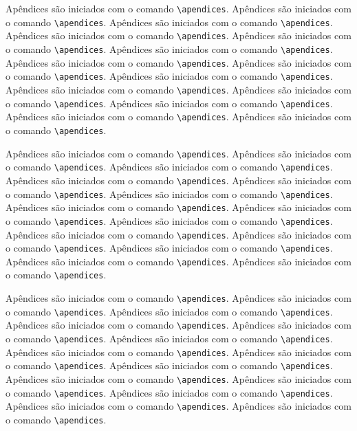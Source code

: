 Apêndices são iniciados com o comando \verb|\apendices|.
Apêndices são iniciados com o comando \verb|\apendices|.
Apêndices são iniciados com o comando \verb|\apendices|.
Apêndices são iniciados com o comando \verb|\apendices|.
Apêndices são iniciados com o comando \verb|\apendices|.
Apêndices são iniciados com o comando \verb|\apendices|.
Apêndices são iniciados com o comando \verb|\apendices|.
Apêndices são iniciados com o comando \verb|\apendices|.
Apêndices são iniciados com o comando \verb|\apendices|.
Apêndices são iniciados com o comando \verb|\apendices|.
Apêndices são iniciados com o comando \verb|\apendices|.
Apêndices são iniciados com o comando \verb|\apendices|.
Apêndices são iniciados com o comando \verb|\apendices|.
Apêndices são iniciados com o comando \verb|\apendices|.

Apêndices são iniciados com o comando \verb|\apendices|.
Apêndices são iniciados com o comando \verb|\apendices|.
Apêndices são iniciados com o comando \verb|\apendices|.
Apêndices são iniciados com o comando \verb|\apendices|.
Apêndices são iniciados com o comando \verb|\apendices|.
Apêndices são iniciados com o comando \verb|\apendices|.
Apêndices são iniciados com o comando \verb|\apendices|.
Apêndices são iniciados com o comando \verb|\apendices|.
Apêndices são iniciados com o comando \verb|\apendices|.
Apêndices são iniciados com o comando \verb|\apendices|.
Apêndices são iniciados com o comando \verb|\apendices|.
Apêndices são iniciados com o comando \verb|\apendices|.
Apêndices são iniciados com o comando \verb|\apendices|.
Apêndices são iniciados com o comando \verb|\apendices|.

Apêndices são iniciados com o comando \verb|\apendices|.
Apêndices são iniciados com o comando \verb|\apendices|.
Apêndices são iniciados com o comando \verb|\apendices|.
Apêndices são iniciados com o comando \verb|\apendices|.
Apêndices são iniciados com o comando \verb|\apendices|.
Apêndices são iniciados com o comando \verb|\apendices|.
Apêndices são iniciados com o comando \verb|\apendices|.
Apêndices são iniciados com o comando \verb|\apendices|.
Apêndices são iniciados com o comando \verb|\apendices|.
Apêndices são iniciados com o comando \verb|\apendices|.
Apêndices são iniciados com o comando \verb|\apendices|.
Apêndices são iniciados com o comando \verb|\apendices|.
Apêndices são iniciados com o comando \verb|\apendices|.
Apêndices são iniciados com o comando \verb|\apendices|.

